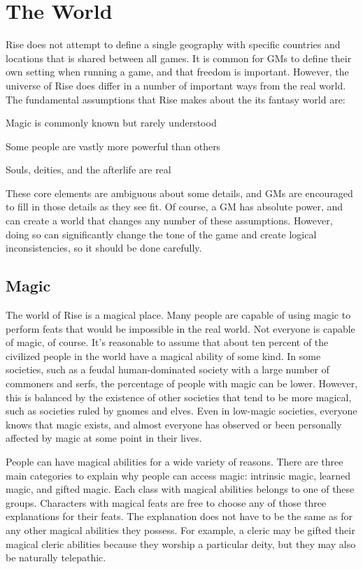 \chapter{The World}

Rise does not attempt to define a single geography with specific countries and locations that is shared between all games.
It is common for GMs to define their own setting when running a game, and that freedom is important.
However, the universe of Rise does differ in a number of important ways from the real world.
The fundamental assumptions that Rise makes about the its fantasy world are:

\begin{raggeditemize}
  \item Magic is commonly known but rarely understood
  \item Some people are vastly more powerful than others
  \item Souls, deities, and the afterlife are real
\end{raggeditemize}

These core elements are ambiguous about some details, and GMs are encouraged to fill in those details as they see fit.
Of course, a GM has absolute power, and can create a world that changes any number of these assumptions.
However, doing so can significantly change the tone of the game and create logical inconsistencies, so it should be done carefully.

\section{Magic}
  The world of Rise is a magical place.
  Many people are capable of using magic to perform feats that would be impossible in the real world.
  Not everyone is capable of magic, of course.
  It's reasonable to assume that about ten percent of the civilized people in the world have a magical ability of some kind.
  In some societies, such as a feudal human-dominated society with a large number of commoners and serfs, the percentage of people with magic can be lower.
  However, this is balanced by the existence of other societies that tend to be more magical, such as societies ruled by gnomes and elves.
  Even in low-magic societies, everyone knows that magic exists, and almost everyone has observed or been personally affected by magic at some point in their lives.

  People can have magical abilities for a wide variety of reasons.
  There are three main categories to explain why people can access magic: intrinsic magic, learned magic, and gifted magic.
  Each class with magical abilities belongs to one of these groups.
  Characters with magical feats are free to choose any of those three explanations for their feats.
  The explanation does not have to be the same as for any other magical abilities they possess.
  For example, a cleric may be gifted their magical cleric abilities because they worship a particular deity, but they may also be naturally telepathic.

